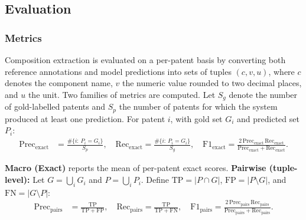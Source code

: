 
\subsection*{Evaluation}
\subsubsection*{Metrics}
Composition extraction is evaluated on a per-patent basis by converting both reference annotations and model predictions into sets of tuples $(c,v,u)$, where $c$ denotes the component name, $v$ the numeric value rounded to two decimal places, and $u$ the unit. Two families of metrics are computed. Let $S_g$ denote the number of gold-labelled patents and $S_p$ the number of patents for which the system produced at least one prediction. For patent $i$, with gold set $G_i$ and predicted set $P_i$:
\begin{align}
\mathrm{Prec}_{\text{exact}} &= \frac{\#\{i:\,P_i = G_i\}}{S_p},\quad
\mathrm{Rec}_{\text{exact}}  = \frac{\#\{i:\,P_i = G_i\}}{S_g},\quad
\mathrm{F1}_{\text{exact}}   = \frac{2\,\mathrm{Prec}_{\text{exact}}\,\mathrm{Rec}_{\text{exact}}}{\mathrm{Prec}_{\text{exact}}+\mathrm{Rec}_{\text{exact}}}.
\end{align}

\noindent\textbf{Macro (Exact)} reports the mean of per-patent exact scores.  
\noindent\textbf{Pairwise (tuple-level):} Let $G=\bigcup_i G_i$ and $P=\bigcup_i P_i$. Define $\mathrm{TP}=|P\cap G|$, $\mathrm{FP}=|P\setminus G|$, and $\mathrm{FN}=|G\setminus P|$:
\begin{align}
\mathrm{Prec}_{\text{pairs}} &= \frac{\mathrm{TP}}{\mathrm{TP}+\mathrm{FP}},\quad
\mathrm{Rec}_{\text{pairs}}  = \frac{\mathrm{TP}}{\mathrm{TP}+\mathrm{FN}},\quad
\mathrm{F1}_{\text{pairs}}   = \frac{2\,\mathrm{Prec}_{\text{pairs}}\,\mathrm{Rec}_{\text{pairs}}}{\mathrm{Prec}_{\text{pairs}}+\mathrm{Rec}_{\text{pairs}}}.
\end{align}

